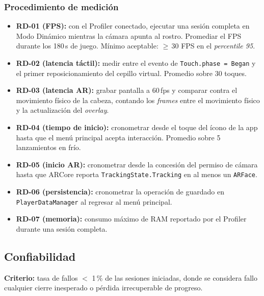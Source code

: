 \documentclass[12pt, a4paper]{article}
\begin{document}
\subsubsection{Procedimiento de medición}

\begin{itemize}[leftmargin=1.5cm, itemsep=4pt]
  \item \textbf{RD-01 (FPS):} con el Profiler conectado, ejecutar una sesión
        completa en Modo Dinámico mientras la cámara apunta al rostro. Promediar
        el FPS durante los 180\,s de juego. Mínimo aceptable: $\geq$\,30 FPS en el
        \textit{percentile 95}.
  \item \textbf{RD-02 (latencia táctil):} medir entre el evento de
        \texttt{Touch.phase = Began} y el primer reposicionamiento del cepillo
        virtual. Promedio sobre 30 toques.
  \item \textbf{RD-03 (latencia AR):} grabar pantalla a 60\,fps y comparar
        contra el movimiento físico de la cabeza, contando los \textit{frames}
        entre el movimiento físico y la actualización del \textit{overlay}.
  \item \textbf{RD-04 (tiempo de inicio):} cronometrar desde el toque del ícono
        de la app hasta que el menú principal acepta interacción. Promedio
        sobre 5 lanzamientos en frío.
  \item \textbf{RD-05 (inicio AR):} cronometrar desde la concesión del permiso
        de cámara hasta que ARCore reporta \texttt{TrackingState.Tracking} en al
        menos un \texttt{ARFace}.
  \item \textbf{RD-06 (persistencia):} cronometrar la operación de guardado
        en \texttt{PlayerDataManager} al regresar al menú principal.
  \item \textbf{RD-07 (memoria):} consumo máximo de RAM reportado por el
        Profiler durante una sesión completa.
\end{itemize}

\subsection{Confiabilidad}

\textbf{Criterio:} tasa de fallos $<$ 1\,\% de las sesiones iniciadas, donde se
considera fallo cualquier cierre inesperado o pérdida irrecuperable de progreso.
\end{document}
